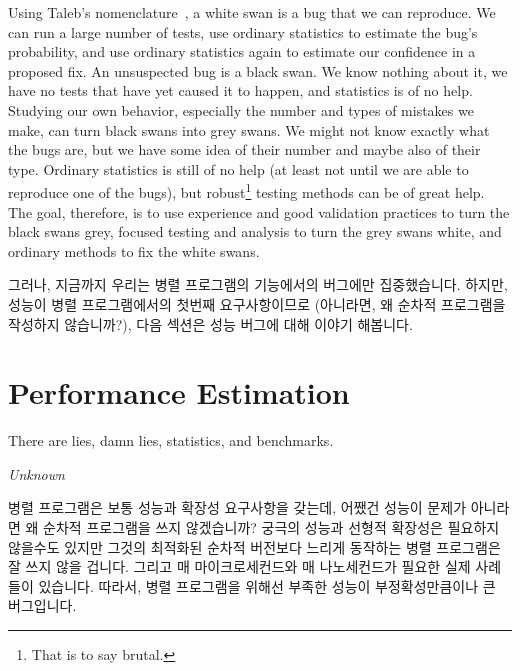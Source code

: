 Using Taleb's nomenclature~\cite{NassimTaleb2007BlackSwan},
a white swan is a bug that we can reproduce.
We can run a large number of tests, use ordinary statistics to
estimate the bug's probability, and use ordinary statistics again
to estimate our confidence in a proposed fix.
An unsuspected bug is a black swan.
We know nothing about it, we have no tests that have yet caused it
to happen, and statistics is of no help.
Studying our own behavior, especially the number and types of mistakes
we make, can turn black swans into grey swans.
We might not know exactly what the bugs are, but we have some idea of
their number and maybe also of their type.
Ordinary statistics is still of no help (at least not until we are
able to reproduce one of the bugs), but robust\footnote{
	That is to say brutal.}
testing methods can be of great help.
The goal, therefore, is to use experience and good validation practices
to turn the black swans grey, focused testing and analysis to turn the
grey swans white, and ordinary methods to fix the white swans.

\fi

그러나, 지금까지 우리는 병렬 프로그램의 기능에서의 버그에만 집중했습니다.
하지만, 성능이 병렬 프로그램에서의 첫번째 요구사항이므로 (아니라면, 왜 순차적
프로그램을 작성하지 않습니까?), 다음 섹션은 성능 버그에 대해 이야기 해봅니다.

\section{Performance Estimation}
\label{sec:debugging:Performance Estimation}
%
\epigraph{There are lies, damn lies, statistics, and benchmarks.}
	 {\emph{Unknown}}

병렬 프로그램은 보통 성능과 확장성 요구사항을 갖는데, 어쨌건 성능이 문제가
아니라면 왜 순차적 프로그램을 쓰지 않겠습니까?
궁극의 성능과 선형적 확장성은 필요하지 않을수도 있지만 그것의 최적화된 순차적
버전보다 느리게 동작하는 병렬 프로그램은 잘 쓰지 않을 겁니다.
그리고 매 마이크로세컨드와 매 나노세컨드가 필요한 실제 사례들이 있습니다.
따라서, 병렬 프로그램을 위해선 부족한 성능이 부정확성만큼이나 큰 버그입니다.


